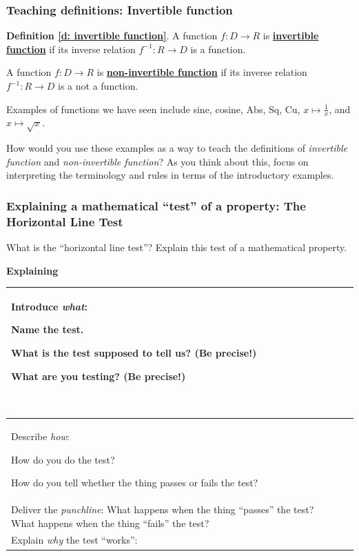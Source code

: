\documentclass[11pt]{article}
\newcommand{\handout}{\subsubsection}
\renewcommand\emph[1]{\underline{\bf{#1}}} %
\theoremstyle{definition}
\begin{document}
\newpage \handout{Teaching definitions: Invertible function}

\begin{mdframed}\raggedright
{\bf Definition \ref{d: invertible function}}.
 A function $f:D\to R$ is \emph{invertible function} if its inverse relation $f^{-1}:R\to D$ is a function.

A function $f:D\to R$ is \emph{non-invertible function} if its inverse relation $f^{-1}:R\to D$ is a not a function.
\end{mdframed}

Examples of functions we have seen include sine, cosine, Abs, Sq, Cu, $x\mapsto \frac{1}{x}$, and $x\mapsto \sqrt{x}$. 

How would you use these examples as a way to teach the definitions of {\it invertible function} and {\it non-invertible function}? As you think about this, focus on interpreting the terminology and rules in terms of the introductory examples.

\newpage 
\handout{Explaining a mathematical ``test'' of a property: The Horizontal Line Test}

What is the ``horizontal line test''? Explain this test of a mathematical property.  

\begin{center}
{\bf Explaining  \underline{\hspace*{2in}}}
\end{center}
\begin{tabular}{|L{2.2in}|L{3.7in}|}
\hline 
Introduce {\it what}:	
	\begin{itemize*}
	\item Name the test.
	\item What is the test supposed to tell us? (Be precise!) 
	\item What are you testing? (Be precise!) 
	\end{itemize*} \vspace*{-12pt}$\;$
	& 

	\\ \hline 
Describe {\it how}:
	\begin{itemize*}
	\item How do you do the test?
	\item How do you tell whether the thing passes or fails the test?
	\end{itemize*}
	& 

	\\ \hline 
Deliver the {\it punchline}: What happens when the thing ``passes'' the test? What happens when the thing ``fails'' the test?
	& 

	 \\ \hline 
Explain {\it why} the test ``works'': 
	& \vspace*{2in}
	\\ \hline 
\end{tabular}
\end{document}
